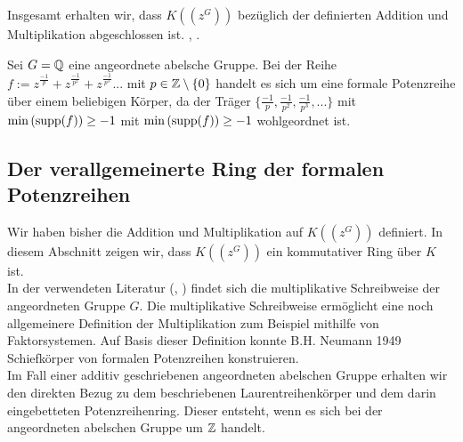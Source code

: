 {%
%
%
%
%
%
}

Insgesamt erhalten wir, dass $K\left(\left(z^{G}\right)\right)$ bezüglich der definierten Addition und Multiplikation abgeschlossen ist. \cite[Seite 601ff]{hahn07}, \cite[S. 210- 213]{neumann49}.
%
% 
%
\begin{bsp}
Sei $G = \mathbb{Q}$ eine angeordnete abelsche Gruppe. Bei der Reihe $f := z^{\frac{-1}{p}}+  z^{\frac{-1}{p^2}} + z^{\frac{-1}{p^3}} ...$ mit $p\in \mathbb{Z}\setminus\lbrace0\rbrace$ handelt es sich um eine formale Potenzreihe über einem beliebigen Körper, da der Träger $\lbrace \frac{-1}{p}, \frac{-1}{p^2}, \frac{-1}{p^3}, ... \rbrace$ mit $\min\left(\textup{supp}(f)\right) \geq -1$ mit $\min\left(\textup{supp}(f)\right)\geq -1$ wohlgeordnet ist.
\end{bsp}
%
%
%
%
%
%
%
%
\subsection{Der verallgemeinerte Ring der formalen Potenzreihen} 
Wir haben bisher die Addition und Multiplikation auf $K\left(\left(z^{G}\right)\right)$ definiert. In diesem Abschnitt zeigen wir, dass $K\left(\left(z^{G}\right)\right)$ ein kommutativer Ring über $K$ ist.\\
In der verwendeten Literatur (\cite{priesscrampe83}, \cite{fuchs66}) findet sich die multiplikative Schreibweise der angeordneten Gruppe $G$. Die multiplikative Schreibweise ermöglicht eine noch allgemeinere Definition der Multiplikation zum Beispiel mithilfe von Faktorsystemen. Auf Basis dieser Definition konnte B.H. Neumann 1949 Schiefkörper von formalen Potenzreihen konstruieren.  \\
Im Fall einer additiv geschriebenen angeordneten abelschen Gruppe erhalten wir den direkten Bezug zu dem beschriebenen Laurentreihenkörper und dem darin eingebetteten Potenzreihenring. Dieser entsteht, wenn es sich bei der angeordneten abelschen Gruppe um $\mathbb{Z}$ handelt. 

